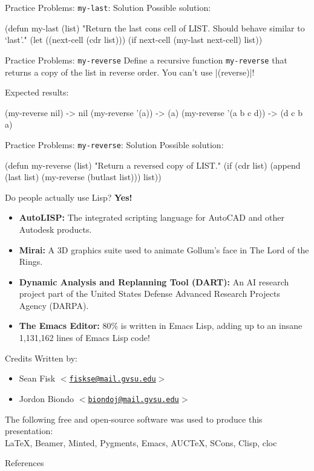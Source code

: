 \documentclass{beamer}
\newcommand{\mailtohref}[1]{\href{mailto:#1}{$<$\nolinkurl{#1}$>$}}
\begin{document}

\begin{frame}[fragile]{Practice Problems: \texttt{my-last}: Solution}
  Possible solution:
  \begin{clcode}
(defun my-last (list)
  "Return the last cons cell of LIST.
Should behave similar to `last'."
  (let ((next-cell (cdr list)))
    (if next-cell
        (my-last next-cell)
      list))
  \end{clcode}
\end{frame}

\begin{frame}[fragile]{Practice Problems: \texttt{my-reverse}}
  Define a recursive function \texttt{my-reverse} that returns a copy
  of the list in reverse order. You can't use \cl|(reverse)|!

Expected results:
\begin{clcode}
  (my-reverse nil) -> nil
  (my-reverse '(a)) -> (a)
  (my-reverse '(a b c d)) -> (d c b a)
\end{clcode}
\end{frame}

\begin{frame}[fragile]{Practice Problems: \texttt{my-reverse}: Solution}
  Possible solution:
  \begin{clcode}
(defun my-reverse (list)
  "Return a reversed copy of LIST."
  (if (cdr list)
      (append (last list) (my-reverse (butlast list)))
    list))
  \end{clcode}
\end{frame}

\begin{frame}{Do people actually use Lisp?}
  \textbf{Yes!}
  \begin{itemize}
  \item \textbf{AutoLISP:} The integrated scripting language for AutoCAD and
    other Autodesk products.
  \item \textbf{Mirai:} A 3D graphics suite used to animate Gollum's face in The Lord of the Rings.
  \item \textbf{Dynamic Analysis and Replanning Tool (DART):} An AI research
    project part of the United States Defense Advanced Research
    Projects Agency (DARPA).
  \item \textbf{The Emacs Editor:} 80\% is written in Emacs Lisp,
    adding up to an insane 1,131,162 lines of Emacs Lisp code!
  \end{itemize}
\end{frame}

\begin{frame}{Credits}
  Written by:
  \begin{itemize}
  \item Sean Fisk \mailtohref{fiskse@mail.gvsu.edu}
  \item Jordon Biondo \mailtohref{biondoj@mail.gvsu.edu}
  \end{itemize}
  The following free and open-source software was used to produce this presentation: \\
  \LaTeX, Beamer, Minted, Pygments, Emacs, AUCTeX, SCons, Clisp, cloc
\end{frame}
\begin{frame}{References}
  \printbibliography
\end{frame}
\end{document}
